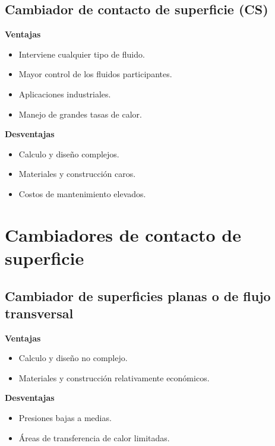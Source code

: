 
\subsection{Cambiador de contacto de superficie (CS)}


\textbf{Ventajas}
\begin{itemize}
    \item Interviene cualquier tipo de fluido.
    \item Mayor control de los fluidos participantes.
    \item Aplicaciones industriales.
    \item Manejo de grandes tasas de calor.
\end{itemize}

\textbf{Desventajas}
\begin{itemize}
    \item Calculo y diseño complejos.
    \item Materiales y construcción caros.
    \item Costos de mantenimiento elevados.
\end{itemize}



\section{Cambiadores de contacto de superficie}

\subsection{Cambiador de superficies planas o de flujo transversal}


\textbf{Ventajas}
\begin{itemize}
    \item Calculo y diseño no complejo.
    \item Materiales y construcción relativamente económicos.
\end{itemize}

\textbf{Desventajas}
\begin{itemize}
    \item Presiones bajas a medias.
    \item Áreas de transferencia de calor limitadas.
\end{itemize}

